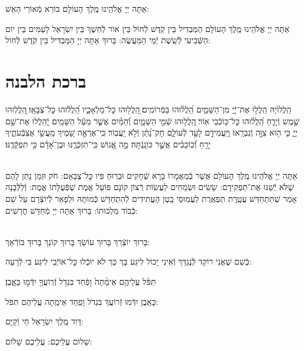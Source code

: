 \documentclass[twoside, openany, parskip=half, 11pt]{book}
\begin{document}
אַתָּה יְיָ אֱלֹהֵֽינוּ מֶֽלֶךְ הָעוֹלָם בּוֹרֵא מְֿאוֹרֵי הָאֵשׁ:

אַתָּה יְיָ אֱלֹהֵֽינוּ מֶֽלֶךְ הָעוֹלָם הַמַּבְדִיל בֵּין קֹֽדֶשׁ לְֿחוֹל בֵּין אוֹר לְֿחֽשֶׁךְ בֵּין יִשְׂרָאֵל לָעַמִּים בֵּין יוֹם הַשְּֿׁבִיעִי לְֿשֵֽׁשֶׁת יְֿמֵי הַמַּעֲשֶׂה: בָּרוּךְ אַתָּה יְיָ הַמַּבְדִּיל בֵּין קֹֽדֶשׁ לְֿחוֹל:
\clearpage

\vspace{-1.3\baselineskip}
\section[ברכת הלבנה]{ ברכת הלבנה }

הַֽלֲלוּ֙יָהּ הַֽלֲל֣וּ אֶת־יְֿ֖יָ מִן־הַשָּׁמַ֑יִם הַֽ֝לֲל֗וּהוּ בַּמְּֿרוֹמִֽים׃
֭הַֽלֲל֥וּהוּ כׇּל־מַלְאָכָ֑יו הַֽ֝לֲל֗וּהוּ כׇּל־צְבָאָֽו׃
֖הַֽלֲלֽוּהוּ שֶׁ֣מֶשׁ וְֿיָרֵ֑חַ הַֽ֝לֲל֗וּהוּ כׇּל־כּ֥וֹכְֿבֵי אֽוֹר׃
֖הַֽלֲל֥וּהוּ שְֿׁמֵ֣י הַשָּׁמָ֑יִם וְֿ֝הַמַּ֗יִם אֲשֶׁ֤ר מֵעַ֬ל הַשָּׁמָֽיִם׃
יְֿ֭הַֽלֲלוּ אֶת־שֵׁ֣ם יְיָ֑ כִּ֤י ה֖וּא צִוָּ֣ה וְֿנִבְרָֽאוּ׃
וַיַּֽעֲמִידֵ֣ם לָעַ֣ד לְֿעוֹלָ֑ם חָק־נָ֝תַ֗ן וְֿלֹ֣א יַֽעֲבֽוֹר׃
כִּֽי־אֶרְאֶ֣ה שָׁ֭מֶיךָ מַֽעֲשֵׂ֣י אֶצְבְּֿעֹתֶ֑יךָ יָרֵ֥חַ וְֿ֝כֽוֹכָבִ֗ים אֲשֶׁ֣ר כּוֹנָֽנְֿתָּה׃
מָ֣ה אֱ֭נוֹשׁ כִּֽי־תִזְכְּֿרֶ֑נּוּ וּבֶן־אָ֝דָ֗ם כִּ֣י תִפְקְֿדֶֽנּוּ׃

\\
אַתָּה יְיָ אֱלֹהֵֽינוּ מֶֽלֶךְ הָעוֹלָם אֲשֶׁר בְּֿמַאֲמָרוֹ בָּרָא שְֿׁחָקִים וּבְרֽוּחַ פִּיו כׇּל־צְבָאָם: חֹק וּזְמַן נָתַן לָהֶם שֶׁלֹּא יְֿשַׁנּוּ אֶת־תַּפְקִידָם: שָׂשִׂים וּשְׂמֵחִים לַעֲשׂוֹת רְֿצוֹן קוֹנָם פּוֹעֵל אֱמֶת שֶׁפְּֿעֻלָּתוֹ אֱמֶת: וְֿלַלְּֿבָנָה אָמַר שֶׁתִּתְחַדֵּשׁ עֲטֶֽרֶת תִּפְאֶֽרֶת לַעֲמֽוּסֵי בָֽטֶן הָעֲתִידִים לְֿהִתְחַדֵּשׁ כְּֿמוֹתָהּ וּלְפָאֵר לְֿיוֹצְֿרָם עַל שֵׁם כְּֿבוֹד מַלְכוּתוֹ: בָּרוּךְ אַתָּה יְיָ מְֿחַדֵּשׁ חֳדָשִׁים:

\\
בָּרוּךְ יוֹצְֿרֵךְ בָּרוּךְ עוֹשֵׂךְ בָּרוּךְ קוֹנֵךְ בָּרוּךְ בּוֹרְֿאֵךְ:

כְּֿשֵׁם שֶׁאֲנִי רוֹקֵד לְֿנֶגְדֵּךְ וְֿאֵינִי יָכוֹל לִיגַּע בָּךְ
כַּךְ לֹא יוּכְֿלוּ כׇּל־אוֹיְֿבַי לִיגַּע בִּי לְֿרָעָה:

תִּפֹּ֨ל עֲלֵיהֶ֤ם אֵימָ֨תָה֙ וָפַ֔חַד בִּגְדֹ֥ל זְֿרֽוֹעֲךָ֖ יִדְּֿמ֣וּ כָּאָ֑בֶן׃


כָּאָֽבֶן יִדְּֿמוּ זְֿרוֹעֲךָ בִּגְדֹל וָפַֽחַד אֵימָֽתָה עֲלֵיהֶם תִּפֹּל:


דָּוִד מֶֽלֶךְ יִשְׂרָאֵל חַי וְֿקַיָּם:

שָׁלוֹם עֲלֵיכֶם: \qquad {}
עֲלֵיכֶם שָׁלוֹם:
\end{document}

